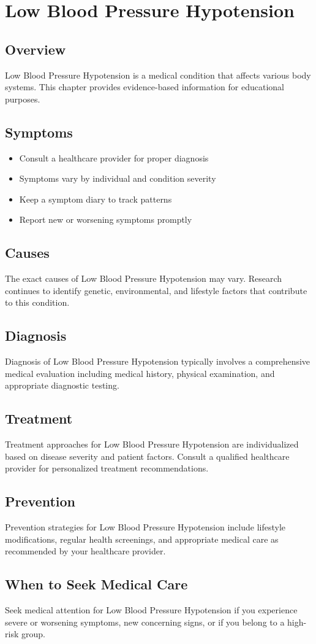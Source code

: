 \chapter{Low Blood Pressure Hypotension}

\section*{Overview}
Low Blood Pressure Hypotension is a medical condition that affects various body systems. This chapter provides evidence-based information for educational purposes.

\section*{Symptoms}
\begin{itemize}
  \item Consult a healthcare provider for proper diagnosis
  \item Symptoms vary by individual and condition severity
  \item Keep a symptom diary to track patterns
  \item Report new or worsening symptoms promptly
\end{itemize}

\section*{Causes}
The exact causes of Low Blood Pressure Hypotension may vary. Research continues to identify genetic, environmental, and lifestyle factors that contribute to this condition.

\section*{Diagnosis}
Diagnosis of Low Blood Pressure Hypotension typically involves a comprehensive medical evaluation including medical history, physical examination, and appropriate diagnostic testing.

\section*{Treatment}
Treatment approaches for Low Blood Pressure Hypotension are individualized based on disease severity and patient factors. Consult a qualified healthcare provider for personalized treatment recommendations.

\section*{Prevention}
Prevention strategies for Low Blood Pressure Hypotension include lifestyle modifications, regular health screenings, and appropriate medical care as recommended by your healthcare provider.

\section*{When to Seek Medical Care}
Seek medical attention for Low Blood Pressure Hypotension if you experience severe or worsening symptoms, new concerning signs, or if you belong to a high-risk group.
\clearpage
